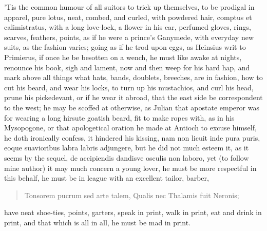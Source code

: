 'Tis the common humour of all suitors to trick up themselves, to be
prodigal in apparel, pure lotus, neat, combed, and curled, with
powdered hair, comptus et calimistratus, with a long love-lock, a
flower in his ear, perfumed gloves, rings, scarves, feathers, points,
\etc{} as if he were a prince's Ganymede, with everyday new suits, as the
fashion varies; going as if he trod upon eggs, as Heinsius writ to
Primierus, if once he be besotten on a wench, he must like awake
at nights, renounce his book, sigh and lament, now and then weep for
his hard hap, and mark above all things what hats, bands, doublets,
breeches, are in fashion, how to cut his beard, and wear his locks, to
turn up his mustachios, and curl his head, prune his pickedevant, or if
he wear it abroad, that the east side be correspondent to the west; he
may be scoffed at otherwise, as Julian that apostate emperor was for
wearing a long hirsute goatish beard, fit to make ropes with, as in his
Mysopogone, or that apologetical oration he made at Antioch to excuse
himself, he doth ironically confess, it hindered his kissing, nam non
licuit inde pura puris, eoque suavioribus labra labris adjungere, but
he did not much esteem it, as it seems by the sequel, de accipiendis
dandisve osculis non laboro, yet (to follow mine author) it may much
concern a young lover, he must be more respectful in this behalf, he
must be in league with an excellent tailor, barber,

\begin{latin}
\begin{verse}
Tonsorem pucrum sed arte talem,
Qualis nec Thalamis fuit Neronis;
\end{verse}
\end{latin}

have neat shoe-ties, points, garters, speak in print, walk in print,
eat and drink in print, and that which is all in all, he must be mad in
print.

